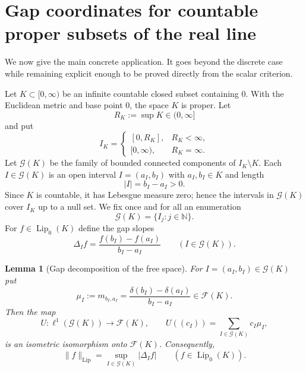 \documentclass[11pt]{amsart}
\theoremstyle{plain}
\newtheorem{lemma}[theorem]{Lemma}
\theoremstyle{definition}
\theoremstyle{remark}
\newcommand{\Lip}{\operatorname{Lip}}
\newcommand{\F}{\mathcal F}
\newcommand{\N}{\mathbb N}
\begin{document}
\section{Gap coordinates for countable proper subsets of the real line}

We now give the main concrete application. It goes beyond the discrete case
while remaining explicit enough to be proved directly from the scalar
criterion.

Let $K\subset [0,\infty)$ be an infinite countable closed subset containing $0$. With the Euclidean metric and base point $0$, the space
$K$ is proper. Let
\[
        R_K:=\sup K\in (0,\infty]
\]
and put
\[
        I_K=
        \begin{cases}
        [0,R_K],& R_K<\infty,\\
        [0,\infty),& R_K=\infty.
        \end{cases}
\]
Let $\mathcal G(K)$ be the family of bounded connected components of
$I_K\setminus K$. Each $I\in\mathcal G(K)$ is an open interval
$I=(a_I,b_I)$ with $a_I,b_I\in K$ and length
\[
        |I|=b_I-a_I>0.
\]
Since $K$ is countable, it has Lebesgue measure zero; hence the intervals in
$\mathcal G(K)$ cover $I_K$ up to a null set. We fix once and for all an
enumeration
\[
        \mathcal G(K)=\{I_j:j\in\N\}.
\]
For $f\in\Lip_0(K)$ define the gap slopes
\[
        \Delta_I f=\frac{f(b_I)-f(a_I)}{b_I-a_I}
        \qquad(I\in\mathcal G(K)).
\]

\begin{lemma}[Gap decomposition of the free space]
\label{lem:gap-FK}
For $I=(a_I,b_I)\in\mathcal G(K)$ put
\[
        \mu_I:=m_{b_I,a_I}
        =\frac{\delta(b_I)-\delta(a_I)}{b_I-a_I}
        \in\F(K).
\]
Then the map
\[
        U:\ell^1(\mathcal G(K))\longrightarrow \F(K),
        \qquad
        U((c_I))=\sum_{I\in\mathcal G(K)}c_I\mu_I,
\]
is an isometric isomorphism onto $\F(K)$. Consequently,
\[
        \|f\|_{\Lip}=
        \sup_{I\in\mathcal G(K)} |\Delta_I f|
        \qquad(f\in\Lip_0(K)).
\]
\end{lemma}
\end{document}
